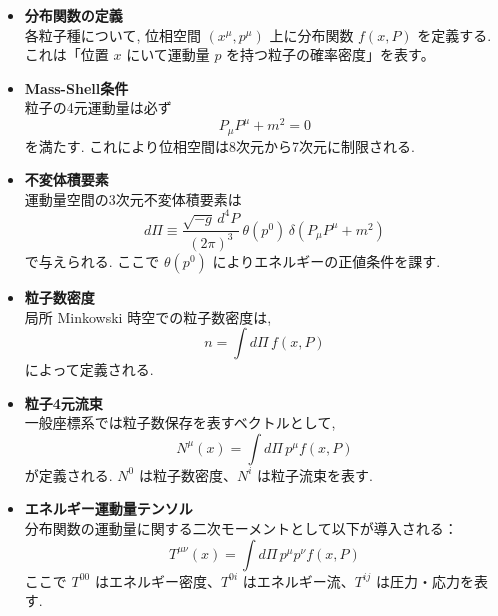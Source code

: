 \documentclass[a4paper,12pt]{article}
\begin{document}
\begin{itemize}
  \item \textbf{分布関数の定義}\\
  各粒子種について, 位相空間 $(x^\mu, p^\mu)$ 上に分布関数 $f(x,P)$ を定義する.  
  これは「位置 $x$ にいて運動量 $p$ を持つ粒子の確率密度」を表す。

  \item \textbf{Mass-Shell条件}\\ 
  粒子の4元運動量は必ず
  \begin{equation}
    P_\mu P^\mu + m^2 = 0
    \tag{6.1}
  \end{equation}
  を満たす. これにより位相空間は8次元から7次元に制限される.

  \item \textbf{不変体積要素}\\  
  運動量空間の3次元不変体積要素は
  \begin{equation}
    d\Pi \equiv \frac{\sqrt{-g}\, d^4P}{(2\pi)^3}\,\theta(p^0)\,\delta(P_\mu P^\mu + m^2)
    \tag{6.2}
  \end{equation}
  で与えられる. ここで $\theta(p^0)$ によりエネルギーの正値条件を課す.

  \item \textbf{粒子数密度}\\  
  局所 Minkowski 時空での粒子数密度は,
  \begin{equation}
    n = \int d\Pi \, f(x,P)
    \tag{6.6}
  \end{equation}
  によって定義される.

  \item \textbf{粒子4元流束}\\  
  一般座標系では粒子数保存を表すベクトルとして,
  \begin{equation}
    N^\mu(x) = \int d\Pi \, p^\mu f(x,P)
    \tag{6.10}
  \end{equation}
  が定義される. $N^0$ は粒子数密度、$N^i$ は粒子流束を表す.

  \item \textbf{エネルギー運動量テンソル}\\  
  分布関数の運動量に関する二次モーメントとして以下が導入される：
  \begin{equation}
    T^{\mu\nu}(x) = \int d\Pi \, p^\mu p^\nu f(x,P)
    \tag{6.17}
  \end{equation}
  ここで $T^{00}$ はエネルギー密度、$T^{0i}$ はエネルギー流、$T^{ij}$ は圧力・応力を表す.
\end{itemize}
\end{document}

